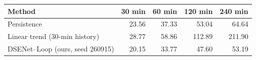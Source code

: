 \begin{tabular}{lrrrr}
\toprule
Method & 30 min & 60 min & 120 min & 240 min \\
\midrule
Persistence & 23.56 & 37.33 & 53.04 & 64.64 \\
Linear trend (30-min history) & 28.77 & 58.86 & 112.89 & 211.90 \\
DSENet--Loop (ours, seed 260915) & 20.15 & 33.77 & 47.60 & 53.19 \\
\bottomrule
\end{tabular}
